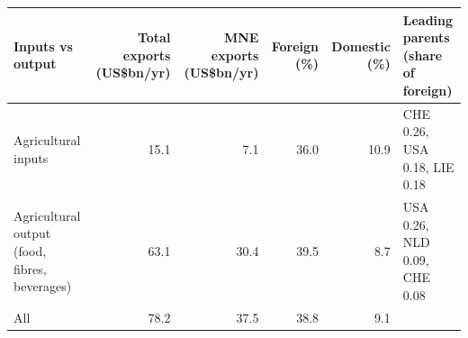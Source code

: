 \begin{tabular}{@{}l r r r r l@{}}
\toprule
Inputs vs output & Total exports (US\$bn/yr) & MNE exports (US\$bn/yr) & Foreign (\%) & Domestic (\%) & Leading parents (share of foreign) \\
\midrule
Agricultural inputs & 15.1 & 7.1 & 36.0 & 10.9 & CHE 0.26, USA 0.18, LIE 0.18 \\
Agricultural output (food, fibres, beverages) & 63.1 & 30.4 & 39.5 & 8.7 & USA 0.26, NLD 0.09, CHE 0.08 \\
\midrule
All & 78.2 & 37.5 & 38.8 & 9.1 & \\
\bottomrule
\end{tabular}
